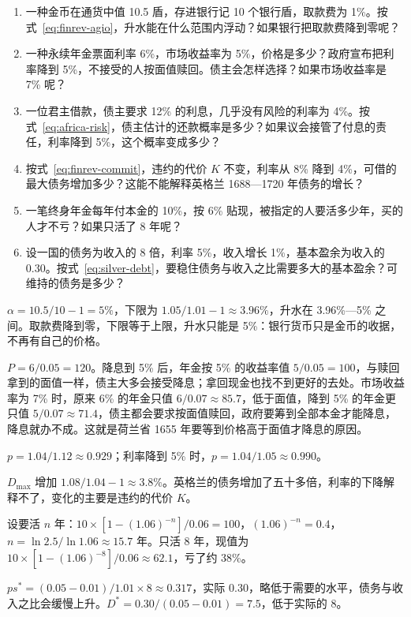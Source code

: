 \begin{selfcheck}
\begin{enumerate}
\item 一种金币在通货中值 10.5 盾，存进银行记 10 个银行盾，取款费为 1\%。按式~\eqref{eq:finrev-agio}，升水能在什么范围内浮动？如果银行把取款费降到零呢？
\item 一种永续年金票面利率 6\%，市场收益率为 5\%，价格是多少？政府宣布把利率降到 5\%，不接受的人按面值赎回。债主会怎样选择？如果市场收益率是 7\% 呢？
\item 一位君主借款，债主要求 12\% 的利息，几乎没有风险的利率为 4\%。按式~\eqref{eq:africa-risk}，债主估计的还款概率是多少？如果议会接管了付息的责任，利率降到 5\%，这个概率变成多少？
\item 按式~\eqref{eq:finrev-commit}，违约的代价 $K$ 不变，利率从 8\% 降到 4\%，可借的最大债务增加多少？这能不能解释英格兰 1688—1720 年债务的增长？
\item 一笔终身年金每年付本金的 10\%，按 6\% 贴现，被指定的人要活多少年，买的人才不亏？如果只活了 8 年呢？
\item 设一国的债务为收入的 8 倍，利率 5\%，收入增长 1\%，基本盈余为收入的 0.30。按式~\eqref{eq:silver-debt}，要稳住债务与收入之比需要多大的基本盈余？可维持的债务是多少？
\end{enumerate}
\end{selfcheck}

\begin{answers}
\item $\alpha=10.5/10-1=5\%$，下限为 $1.05/1.01-1\approx3.96\%$，升水在 3.96\%—5\% 之间。取款费降到零，下限等于上限，升水只能是 5\%：银行货币只是金币的收据，不再有自己的价格。
\item $P=6/0.05=120$。降息到 5\% 后，年金按 5\% 的收益率值 $5/0.05=100$，与赎回拿到的面值一样，债主大多会接受降息；拿回现金也找不到更好的去处。市场收益率为 7\% 时，原来 6\% 的年金只值 $6/0.07\approx85.7$，低于面值，降到 5\% 的年金更只值 $5/0.07\approx71.4$，债主都会要求按面值赎回，政府要筹到全部本金才能降息，降息就办不成。这就是荷兰省 1655 年要等到价格高于面值才降息的原因。
\item $p=1.04/1.12\approx0.929$；利率降到 5\% 时，$p=1.04/1.05\approx0.990$。
\item $D_{\max}$ 增加 $1.08/1.04-1\approx3.8\%$。英格兰的债务增加了五十多倍，利率的下降解释不了，变化的主要是违约的代价 $K$。
\item 设要活 $n$ 年：$10\times[1-(1.06)^{-n}]/0.06=100$，$(1.06)^{-n}=0.4$，$n=\ln2.5/\ln1.06\approx15.7$ 年。只活 8 年，现值为 $10\times[1-(1.06)^{-8}]/0.06\approx62.1$，亏了约 38\%。
\item $ps^{*}=(0.05-0.01)/1.01\times8\approx0.317$，实际 0.30，略低于需要的水平，债务与收入之比会缓慢上升。$D^{*}=0.30/(0.05-0.01)=7.5$，低于实际的 8。
\end{answers}

